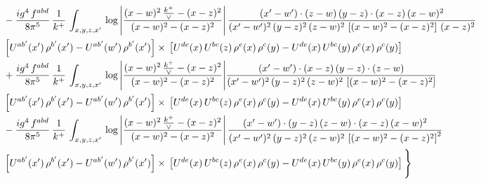 \documentclass[9pt]{article}
\numberwithin{equation}{section}
\begin{document}
\begin{align}
& - \frac{ig^{4}\, f^{abd}}{8\pi^{5}}\, \frac{1}{k^{+}}\, \int_{x,y,z,x'}\,\log{\left|\frac{(x-w)^{2}\,\frac{k^{+}}{\vee}-(x-z)^{2}}{(x-w)^{2}-(x-z)^{2}}\right|}\,\frac{(x'-w')\cdot (z-w)\, (y-z)\cdot (x-z)\, (x-w)^{2}}{(x'-w')^{2}\, (y-z)^{2}\, (z-w)^{2}\,\left[(x-w)^{2} - (x-z)^{2}\right]\, (x-z)^{2}}\, \notag \\ & \left[U^{ab'}(x')\,\rho^{b'}(x')-U^{ab'}(w')\, \rho^{b'}(x')\right]\times\,\left[U^{de}(x)\,U^{bc}(z)\, \rho^{e}(x)\,\rho^{c}(y)-U^{de}(x)\,U^{bc}(y)\,\rho^{e}(x)\,\rho^{c}(y)\right] \notag \\
& +\frac{ig^{4}\, f^{abd}}{8\pi^{5}}\, \frac{1}{k^{+}}\, \int_{x,y,z,x'}\,\log{\left|\frac{(x-w)^{2}\,\frac{k^{+}}{\vee}-(x-z)^{2}}{(x-w)^{2}-(x-z)^{2}}\right|}\frac{(x'-w')\cdot (x-z)\, (y-z)\cdot (z-w)}{(x'-w')^{2}\, (y-z)^{2}\, (z-w)^{2}\,\left[(x-w)^{2} -(x-z)^{2}\right]}\, \notag \\ & \left[U^{ab'}(x')\,\rho^{b'}(x')-U^{ab'}(w')\, \rho^{b'}(x')\right]\times\,\left[U^{de}(x)\,U^{bc}(z)\, \rho^{e}(x)\,\rho^{c}(y)-U^{de}(x)\,U^{bc}(y)\,\rho^{e}(x)\,\rho^{c}(y)\right] \notag \\
& -\frac{ig^{4}\, f^{abd}}{8\pi^{5}}\, \frac{1}{k^{+}}\, \int_{x,y,z,x'}\,\log{\left|\frac{(x-w)^{2}\,\frac{k^{+}}{\vee}-(x-z)^{2}}{(x-w)^{2}-(x-z)^{2}}\right|}\,\frac{(x'-w')\cdot (y-z)\, (z-w)\cdot (x-z)\,(x-w)^{2}}{(x'-w')^{2}\, (y-z)^{2}\, (z-w)^{2}\,\left[(x-w)^{2}-(x-z)^{2}\right]^{2}}\, \notag \\ & \left[U^{ab'}(x')\,\rho^{b'}(x')-U^{ab'}(w')\, \rho^{b'}(x')\right]\times\,\left[U^{de}(x)\,U^{bc}(z)\, \rho^{e}(x)\,\rho^{c}(y)-U^{de}(x)\,U^{bc}(y)\,\rho^{e}(x)\,\rho^{c}(y)\right]\Bigg\}
\end{align}
\end{document}
